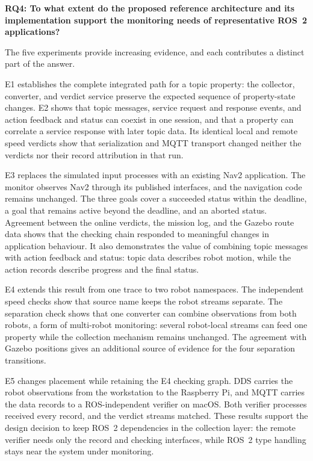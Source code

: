 \textbf{RQ4: To what extent do the proposed reference architecture and its
implementation support the monitoring needs of representative ROS~2
applications?}

The five experiments provide increasing evidence, and each contributes a
distinct part of the answer.

E1 establishes the complete integrated path for a topic property: the
collector, converter, and verdict service preserve the expected sequence of
property-state changes. E2 shows that topic messages, service request and
response events, and action feedback and status can coexist in one session,
and that a property can correlate a service response with later topic data.
Its identical local and remote speed verdicts show that serialization and MQTT
transport changed neither the verdicts nor their record attribution in that
run.

E3 replaces the simulated input processes with an
existing Nav2 application. The monitor observes Nav2 through its published
interfaces, and the navigation code remains unchanged. The three goals cover a
succeeded status within the deadline, a goal that remains active beyond the
deadline, and an aborted status. Agreement between the online verdicts, the
mission log, and the Gazebo route data shows that the checking chain responded
to meaningful changes in application behaviour. It also demonstrates the value
of combining topic messages with action feedback and status: topic data
describes robot motion, while the action records describe progress and the
final status.

E4 extends this result from one trace to two robot namespaces. The independent
speed checks show that source name keeps the robot streams separate. The
separation check shows that one converter can combine observations from both
robots, a form of multi-robot monitoring: several robot-local
streams can feed one property while the collection mechanism remains
unchanged. The agreement with Gazebo positions gives an additional source of
evidence for the four separation transitions.

E5 changes placement while retaining the E4 checking graph. DDS carries the
robot observations from the workstation to the Raspberry Pi, and MQTT carries
the data records to a ROS-independent verifier on macOS. Both verifier
processes received every record, and the verdict streams matched. These
results support the design decision to keep ROS~2 dependencies in the
collection layer: the remote verifier needs only the record and checking
interfaces, while ROS~2 type handling stays near the system under monitoring.

